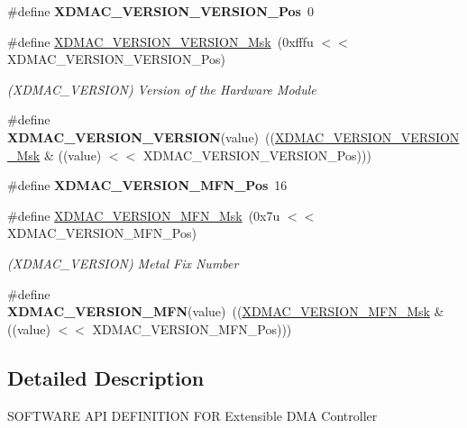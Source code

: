 \begin{DoxyCompactItemize}
\item 
\mbox{\label{group__SAMV71__XDMAC_gaa3f5c5d8a82048e221413885bb93af26}} 
\#define {\bfseries X\+D\+M\+A\+C\+\_\+\+V\+E\+R\+S\+I\+O\+N\+\_\+\+V\+E\+R\+S\+I\+O\+N\+\_\+\+Pos}~0
\item 
\mbox{\label{group__SAMV71__XDMAC_ga047cf3fa7dd49c7d86b030409183aeb7}} 
\#define \mbox{\hyperlink{group__SAMV71__XDMAC_ga047cf3fa7dd49c7d86b030409183aeb7}{X\+D\+M\+A\+C\+\_\+\+V\+E\+R\+S\+I\+O\+N\+\_\+\+V\+E\+R\+S\+I\+O\+N\+\_\+\+Msk}}~(0xfffu $<$$<$ X\+D\+M\+A\+C\+\_\+\+V\+E\+R\+S\+I\+O\+N\+\_\+\+V\+E\+R\+S\+I\+O\+N\+\_\+\+Pos)
\begin{DoxyCompactList}\small\item\em (X\+D\+M\+A\+C\+\_\+\+V\+E\+R\+S\+I\+ON) Version of the Hardware Module \end{DoxyCompactList}\item 
\mbox{\label{group__SAMV71__XDMAC_ga018f4f569efec1201d69f38494f2a076}} 
\#define {\bfseries X\+D\+M\+A\+C\+\_\+\+V\+E\+R\+S\+I\+O\+N\+\_\+\+V\+E\+R\+S\+I\+ON}(value)~((\mbox{\hyperlink{group__SAMV71__XDMAC_ga047cf3fa7dd49c7d86b030409183aeb7}{X\+D\+M\+A\+C\+\_\+\+V\+E\+R\+S\+I\+O\+N\+\_\+\+V\+E\+R\+S\+I\+O\+N\+\_\+\+Msk}} \& ((value) $<$$<$ X\+D\+M\+A\+C\+\_\+\+V\+E\+R\+S\+I\+O\+N\+\_\+\+V\+E\+R\+S\+I\+O\+N\+\_\+\+Pos)))
\item 
\mbox{\label{group__SAMV71__XDMAC_ga36824b7e565f29d62b55a46d86fec19a}} 
\#define {\bfseries X\+D\+M\+A\+C\+\_\+\+V\+E\+R\+S\+I\+O\+N\+\_\+\+M\+F\+N\+\_\+\+Pos}~16
\item 
\mbox{\label{group__SAMV71__XDMAC_gad9579e080f91170d4584b23758322ec0}} 
\#define \mbox{\hyperlink{group__SAMV71__XDMAC_gad9579e080f91170d4584b23758322ec0}{X\+D\+M\+A\+C\+\_\+\+V\+E\+R\+S\+I\+O\+N\+\_\+\+M\+F\+N\+\_\+\+Msk}}~(0x7u $<$$<$ X\+D\+M\+A\+C\+\_\+\+V\+E\+R\+S\+I\+O\+N\+\_\+\+M\+F\+N\+\_\+\+Pos)
\begin{DoxyCompactList}\small\item\em (X\+D\+M\+A\+C\+\_\+\+V\+E\+R\+S\+I\+ON) Metal Fix Number \end{DoxyCompactList}\item 
\mbox{\label{group__SAMV71__XDMAC_ga3237e8fe5bca2ad9ccb09a1b44156da1}} 
\#define {\bfseries X\+D\+M\+A\+C\+\_\+\+V\+E\+R\+S\+I\+O\+N\+\_\+\+M\+FN}(value)~((\mbox{\hyperlink{group__SAMV71__XDMAC_gad9579e080f91170d4584b23758322ec0}{X\+D\+M\+A\+C\+\_\+\+V\+E\+R\+S\+I\+O\+N\+\_\+\+M\+F\+N\+\_\+\+Msk}} \& ((value) $<$$<$ X\+D\+M\+A\+C\+\_\+\+V\+E\+R\+S\+I\+O\+N\+\_\+\+M\+F\+N\+\_\+\+Pos)))
\end{DoxyCompactItemize}


\subsection{Detailed Description}
S\+O\+F\+T\+W\+A\+RE A\+PI D\+E\+F\+I\+N\+I\+T\+I\+ON F\+OR Extensible D\+MA Controller 